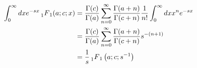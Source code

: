 \item

\begin{align*}
    \int_0^\infty dx e^{-sx} \prescript{}{1}{F}_{1}(a; c; x)
    &= \frac{\Gamma(c)}{\Gamma(a)} \sum_{n = 0}^\infty
       \frac{\Gamma(a + n)}{\Gamma(c + n)}
       \frac{1}{n!} \int_0^\infty dx x^n e^{-sx} \\
    &= \frac{\Gamma(c)}{\Gamma(a)} \sum_{n = 0}^\infty
       \frac{\Gamma(a + n)}{\Gamma(c + n)} s^{-(n + 1)} \\
    &= \frac{1}{s} \prescript{}{1}{F}_{1} \left( a; c; s^{-1} \right)
\end{align*}
